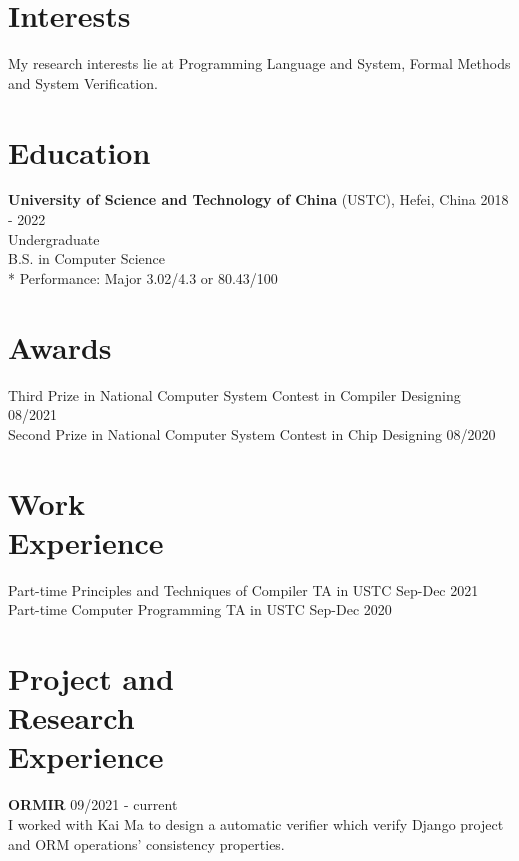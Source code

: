 \documentclass[margin, 10pt]{res}
\begin{document}
\address{{\bf Present Address} \\ Dept. of Computer Science\\ USTC\\
        230026 Hefei, P.R.China  }
\address{{\bf Contact Info} \\ (+86)18618154314 \\
         zhuez1819@mail.ustc.edu.cn }

\begin{resume}

\section{Interests}
My research interests lie at Programming Language and System, Formal Methods and System Verification. 
\section{Education}

{\bf University of Science and Technology of China} (USTC), Hefei, China \hfill 2018 - 2022 \\
Undergraduate \\
B.S. in Computer Science \\
* Performance: Major 3.02/4.3 or 80.43/100


\section{Awards}
Third Prize in National Computer System Contest in Compiler Designing \hfill 08/2021 \\
Second Prize in National Computer System Contest in Chip Designing \hfill 08/2020

\section{Work \\ Experience}
Part-time Principles and Techniques of Compiler TA in USTC \hfill Sep-Dec 2021 \\
Part-time Computer Programming TA in USTC \hfill Sep-Dec 2020

\section{Project and \\ Research \\ Experience}
{\bf ORMIR} 09/2021 - current \\
I worked with Kai Ma to design a automatic verifier which verify Django project and ORM operations' consistency properties.


\end{resume}
\end{document}
